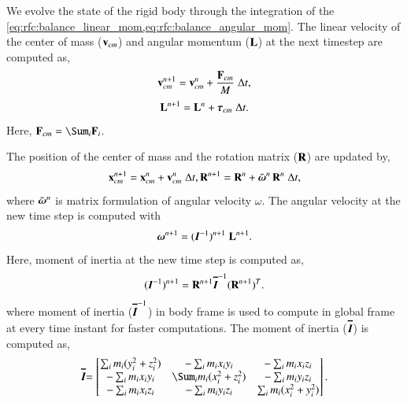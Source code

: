 We evolve the state of the rigid body through the integration of the
\cref{eq:rfc:balance_linear_mom,eq:rfc:balance_angular_mom}. The linear velocity of the
center of mass ($\mathbf{v}_{cm}$) and angular momentum ($\mathbf{L}$) at the next
timestep are computed as,
\begin{equation}
  \label{eq:rfc:lin_vel_cm_update}
  \mathbf{v}_{cm}^{n+1} = \mathbf{v}_{cm}^{n} + \frac{\mathbf{F}_{cm}}{M} \; \Delta t,
\end{equation}
\begin{equation}
  \label{eq:rfc:ang_mom_update}
  \mathbf{L}^{n+1} = \mathbf{L}^{n} + \boldsymbol{\tau}_{cm} \; \Delta t.
\end{equation}
Here, $\ten{F}_{cm} = \Sum_i \ten{F}_i$.

The position of the center of mass and the rotation matrix ($\mathbf{R}$) are updated
by,
\begin{equation}
  \label{eq:rfc:lin_pos_cm_update}
  \mathbf{x}_{cm}^{n+1} = \mathbf{x}_{cm}^{n} + \mathbf{v}_{cm}^{n} \; \Delta t,\\
  \mathbf{R}^{n+1} = \mathbf{R}^{n} + \tilde{\boldsymbol{\omega}}^{n} \, \mathbf{R}^{n} \; \Delta t,
\end{equation}
where $\tilde{\boldsymbol{\omega}}^{n}$ is matrix formulation of angular velocity
$\omega$. The angular velocity at the new time step is computed with
\begin{equation}
  \label{eq:rfc:ang_velocity_update}
  \boldsymbol{\omega}^{n+1} = (\textit{\ensuremath{\boldsymbol{I}}}^{-1})^{n+1} \; \mathbf{L}^{n+1}.
\end{equation}
Here, moment of inertia at the new time step is computed as,
\begin{equation}
  \label{eq:rfc:moi_update}
  (\textit{\ensuremath{\boldsymbol{I}}}^{-1})^{n+1} = \mathbf{R}^{n+1} \textit{\ensuremath{\boldsymbol{\overline{I}}}}^{-1} (\mathbf{R}^{n+1})^T.
\end{equation}
where moment of inertia ($\textit{\ensuremath{\boldsymbol{\overline{I}}}}^{-1}$) in body frame is
used to compute in global frame at every time instant for faster computations.
The moment of inertia ($\textit{\ensuremath{\boldsymbol{\overline{I}}}}$) is computed as,
\begin{equation*}
$\textit{\teng{\overline{I}}}$ =
\begin{bmatrix}
\sum_i m_i (y_i^2 + z_i^2) & -\sum_i m_i x_iy_i & -\sum_i m_i x_iz_i\\
-\sum_i m_i x_iy_i & \Sum_i m_i (x_i^2 + z_i^2) &  -\sum_i m_i y_iz_i\\
-\sum_i m_i  x_iz_i & -\sum_i m_i y_iz_i & \sum_i m_i (x_i^2 + y_i^2)
\end{bmatrix}.
\end{equation*}

